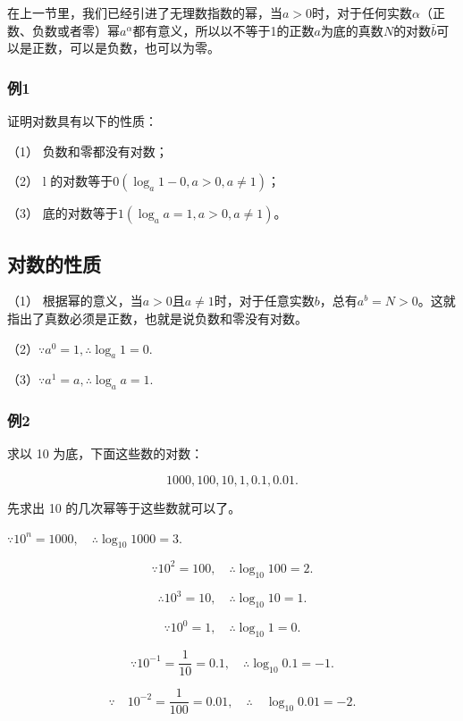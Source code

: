 在上一节里，我们已经引进了无理数指数的幂，当\(a > 0\)时，对于任何实数\(\alpha\)（正数、负数或者零）幂\(a^{\alpha}\)都有意义，所以以不等于1的正数\(a\)为底的真数\(N\)的对数\(\bar{b}\)可以是正数，可以是负数，也可以为零。

\subsubsection{例1}

证明对数具有以下的性质：

（1） 负数和零都没有对数；

（2） l 的对数等于\(0 (\log_{a}1-0, a>0, a\neq1)\)；

（3） 底的对数等于\(1(\log_{a}a=1, a>0, a\neq1)\)。

\subsection{对数的性质}


（1）
根据幂的意义，当\(a > 0\)且\(a \neq 1\)时，对于任意实数\(b\)，总有\(a^b = N > 0\)。这就指出了真数必须是正数，也就是说负数和零没有对数。

（2）\(\because a^0 = 1, \therefore \log_a 1 = 0.\)

（3）\(\because a^{1} = a, \therefore \log_{a} a = 1.\)

\subsubsection{例2}

求以 10 为底，下面这些数的对数：

\[
1000, 100, 10, 1, 0.1, 0.01.
\]

 先求出 10 的几次幂等于这些数就可以了。

\(\because 10^{n} = 1000, \quad \therefore \log_{10}1000 = 3.\)

\[
\because 10^{2} = 100, \quad \therefore \log_{10} 100 = 2.
\]

\[
\therefore 10^{3} = 10, \quad \therefore \log_{10} 10 = 1.
\]

\[
\because 10^{0} = 1, \quad \therefore \log_{10} 1 = 0.
\]

\[
\because 10^{- 1} = \frac{1}{10} = 0.1, \quad \therefore \log_{10} 0.1 = - 1.
\]

\[
\because \quad 10^{- 2} = \frac{1}{100} = 0.01, \quad \therefore \quad \log_{10} 0.01 = - 2.
\]

